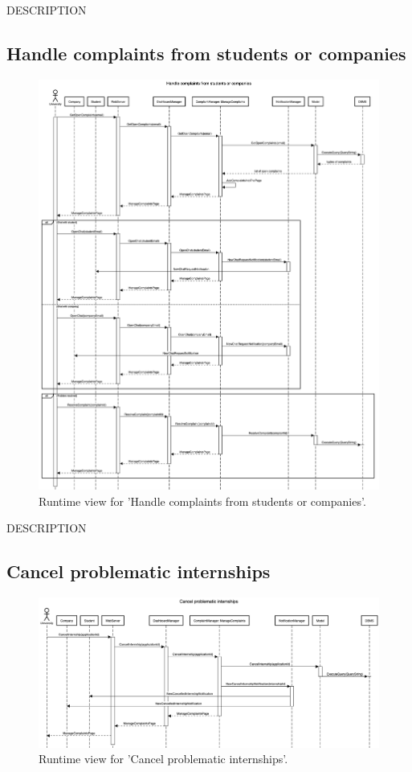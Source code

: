 DESCRIPTION


\subsection{Handle complaints from students or companies}
\begin{figure}[H]
    \begin{center}
        \includegraphics[width=0.8\linewidth]{DD/LaTeX/Images/RuntimeView/HandleComplaints.png}
        \caption{Runtime view for 'Handle complaints from students or companies'.}
        \label{fig:runtime_HandleComplaints}%
    \end{center}
\end{figure}

DESCRIPTION


\subsection{Cancel problematic internships}
\begin{figure}[H]
    \begin{center}
        \includegraphics[width=0.8\linewidth]{DD/LaTeX/Images/RuntimeView/CancelProblematicInternships.png}
        \caption{Runtime view for 'Cancel problematic internships'.}
        \label{fig:runtime_CancelProblematicInternships}%
    \end{center}
\end{figure}

